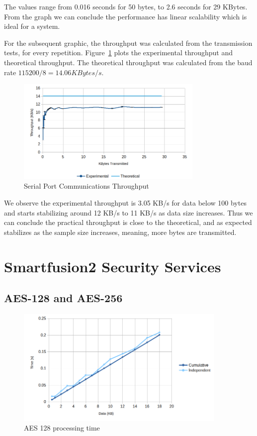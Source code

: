 The values range from 0.016 seconds for 50 bytes, to 2.6 seconds for 29 KBytes.
From the graph we can conclude the performance has linear scalability which is ideal for a system.

For the subsequent graphic, the throughput was calculated from the transmission tests, for every repetition.
Figure~\ref{fig:comms:tput} plots the experimental throughput and theoretical throughput. The theoretical throughput was calculated from the baud rate \(115200/8 = 14.06 KBytes/s\).
\begin{figure}[h!]
	\centering
	\includegraphics[width=0.8\textwidth]{./Images/comms-tput.png}
	\caption{Serial Port Communications Throughput}
	\label{fig:comms:tput}
\end{figure}

We observe the experimental throughput is 3.05 KB/s for data below 100 bytes and starts stabilizing around 12 KB/s to 11 KB/s as data size increases.
Thus we can conclude the practical throughput is close to the theoretical, and as expected stabilizes as the sample size increases, meaning, more bytes are transmitted.

\section{Smartfusion2 Security Services}\label{chap:evaluation:board}

\subsection{AES-128 and AES-256}\label{chap:evaluation:board:aes}

\begin{figure}[h!]
	\centering
	\includegraphics[width=0.9\textwidth]{./Images/aes128-compare.png}
	\caption{AES 128 processing time}
	\label{fig:performance:aes128:compare}
\end{figure}

